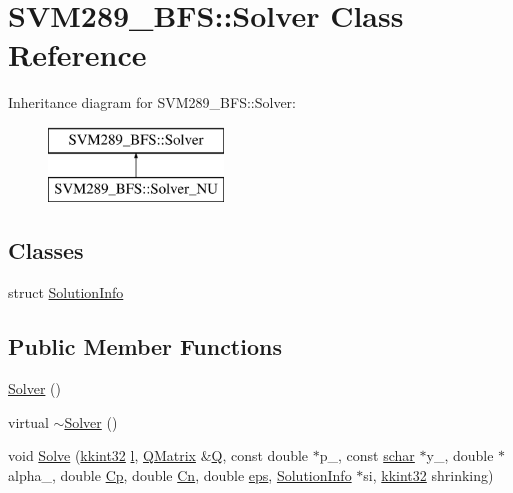 \hypertarget{class_s_v_m289___b_f_s_1_1_solver}{}\section{S\+V\+M289\+\_\+\+B\+FS\+:\+:Solver Class Reference}
\label{class_s_v_m289___b_f_s_1_1_solver}
Inheritance diagram for S\+V\+M289\+\_\+\+B\+FS\+:\+:Solver\+:\begin{figure}[H]
\begin{center}
\leavevmode
\includegraphics[height=2.000000cm]{class_s_v_m289___b_f_s_1_1_solver}
\end{center}
\end{figure}
\subsection*{Classes}
\begin{DoxyCompactItemize}
\item 
struct \hyperlink{struct_s_v_m289___b_f_s_1_1_solver_1_1_solution_info}{Solution\+Info}
\end{DoxyCompactItemize}
\subsection*{Public Member Functions}
\begin{DoxyCompactItemize}
\item 
\hyperlink{class_s_v_m289___b_f_s_1_1_solver_a40eda8ec8f837efb2a4a8a16bb861985}{Solver} ()
\item 
virtual \hyperlink{class_s_v_m289___b_f_s_1_1_solver_a141b3c3961d350ff9177222d7905c0bc}{$\sim$\+Solver} ()
\item 
void \hyperlink{class_s_v_m289___b_f_s_1_1_solver_ab9cf8b8cfa73c0a259b6e0c3e298bd31}{Solve} (\hyperlink{namespace_k_k_b_a8fa4952cc84fda1de4bec1fbdd8d5b1b}{kkint32} \hyperlink{class_s_v_m289___b_f_s_1_1_solver_af63e60689ab3dd865e76e2c1d35db148}{l}, \hyperlink{class_s_v_m289___b_f_s_1_1_q_matrix}{Q\+Matrix} \&\hyperlink{class_s_v_m289___b_f_s_1_1_solver_ae0494fb6f65df63e46d76059ef07e3ec}{Q}, const double $\ast$p\+\_\+, const \hyperlink{namespace_s_v_m289___b_f_s_a67b51ac46a91cdb7ad72dea9fad6c0f0}{schar} $\ast$y\+\_\+, double $\ast$alpha\+\_\+, double \hyperlink{class_s_v_m289___b_f_s_1_1_solver_a7bae981240155350227523f2bd08ee87}{Cp}, double \hyperlink{class_s_v_m289___b_f_s_1_1_solver_ad0dd3ddc87834e0b9dbe7d2132a440ea}{Cn}, double \hyperlink{class_s_v_m289___b_f_s_1_1_solver_abb1bb8ca9d36e39da8cc535b4b49b57c}{eps}, \hyperlink{struct_s_v_m289___b_f_s_1_1_solver_1_1_solution_info}{Solution\+Info} $\ast$si, \hyperlink{namespace_k_k_b_a8fa4952cc84fda1de4bec1fbdd8d5b1b}{kkint32} shrinking)
\end{DoxyCompactItemize}
